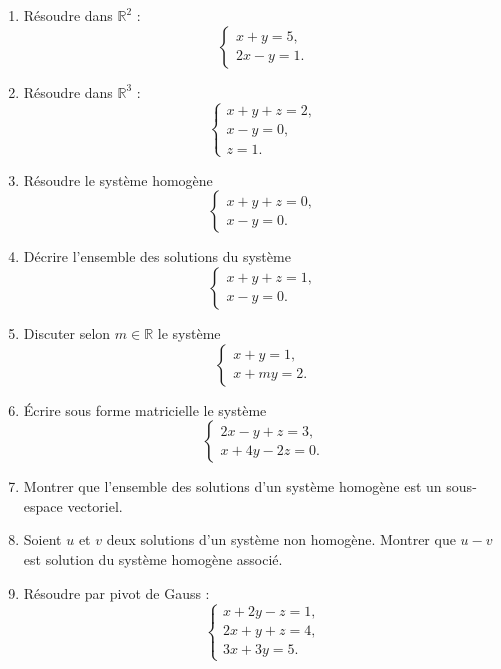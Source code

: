 \documentclass[11pt,a4paper]{article}
\theoremstyle{remark}
\newcommand{\R}{\mathbb{R}}
\begin{document}
\begin{enumerate}[label=\textbf{Exercice \arabic*.}]
    \item Résoudre dans \(\R^2\) :
    \[
    \begin{cases}
    x+y=5,\\
    2x-y=1.
    \end{cases}
    \]

    \item Résoudre dans \(\R^3\) :
    \[
    \begin{cases}
    x+y+z=2,\\
    x-y=0,\\
    z=1.
    \end{cases}
    \]

    \item Résoudre le système homogène
    \[
    \begin{cases}
    x+y+z=0,\\
    x-y=0.
    \end{cases}
    \]

    \item Décrire l’ensemble des solutions du système
    \[
    \begin{cases}
    x+y+z=1,\\
    x-y=0.
    \end{cases}
    \]

    \item Discuter selon \(m\in\R\) le système
    \[
    \begin{cases}
    x+y=1,\\
    x+my=2.
    \end{cases}
    \]

    \item Écrire sous forme matricielle le système
    \[
    \begin{cases}
    2x-y+z=3,\\
    x+4y-2z=0.
    \end{cases}
    \]

    \item Montrer que l’ensemble des solutions d’un système homogène est un sous-espace vectoriel.

    \item Soient \(u\) et \(v\) deux solutions d’un système non homogène. Montrer que \(u-v\) est solution du système homogène associé.

    \item Résoudre par pivot de Gauss :
    \[
    \begin{cases}
    x+2y-z=1,\\
    2x+y+z=4,\\
    3x+3y=5.
    \end{cases}
    \]


\end{enumerate}
\end{document}
